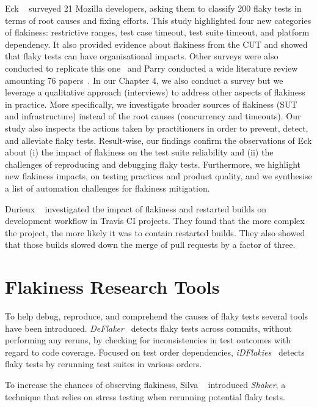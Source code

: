 Eck \etal~\cite{Eck2019} surveyed 21 Mozilla developers, asking them to classify 200 flaky tests in terms of root causes and fixing efforts. 
This study highlighted four new categories of flakiness: restrictive ranges, test case timeout, test suite timeout, and platform dependency.
It also provided evidence about flakiness from the CUT and showed that flaky tests can have organisational impacts. Other surveys were also conducted to replicate this one~\cite{parry2022surveying,gruber2022survey} and Parry \etal conducted a wide literature review amounting 76 papers~\cite{Parry2021}.
In our Chapter 4, we also conduct a survey but we leverage a qualitative approach (interviews) to address other aspects of flakiness in practice.
More specifically, we investigate broader sources of flakiness (\eg SUT and infrastructure) instead of the root causes (\eg concurrency and timeouts).
Our study also inspects the actions taken by practitioners in order to prevent, detect, and alleviate flaky tests.
Result-wise, our findings confirm the observations of Eck \etal about (i) the impact of flakiness on the test suite reliability and (ii) the challenges of reproducing and debugging flaky tests.
Furthermore, we highlight new flakiness impacts, on testing practices and product quality, and we synthesise a list of automation challenges for flakiness mitigation.

Durieux \etal~\cite{durieux2020empirical} investigated the impact of flakiness and restarted builds on development workflow in Travis CI projects. They found that the more complex the project, the more likely it was to contain restarted builds. They also showed that those builds slowed down the merge of pull requests by a factor of three.

\section{Flakiness Research Tools}

To help debug, reproduce, and comprehend the causes of flaky tests several tools have been introduced. \textit{DeFlaker}~\cite{Bell2018} detects flaky tests across commits, without performing any reruns, by checking for inconsistencies in test outcomes with regard to code coverage. Focused on test order dependencies, \textit{iDFlakies}~\cite{Lam2019iDFlakies} detects flaky tests by rerunning test suites in various orders. 

To increase the chances of observing flakiness, Silva \etal~\cite{Silva2020} introduced \textit{Shaker}, a technique that relies on stress testing when rerunning potential flaky tests.  

